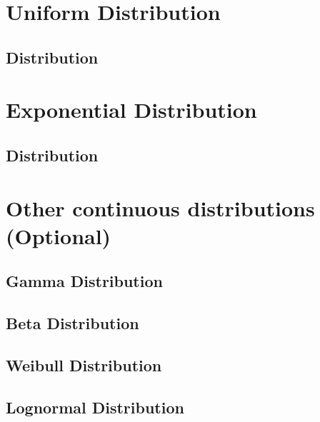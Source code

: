 \section{Uniform Distribution}  %
\subsection{Distribution}  %

\section{Exponential Distribution}  %
\subsection{Distribution}  %

\section{Other continuous distributions (Optional)}  %
\subsection{Gamma Distribution}  %
\subsection{Beta Distribution}  %
\subsection{Weibull Distribution}  %
\subsection{Lognormal Distribution}  %
